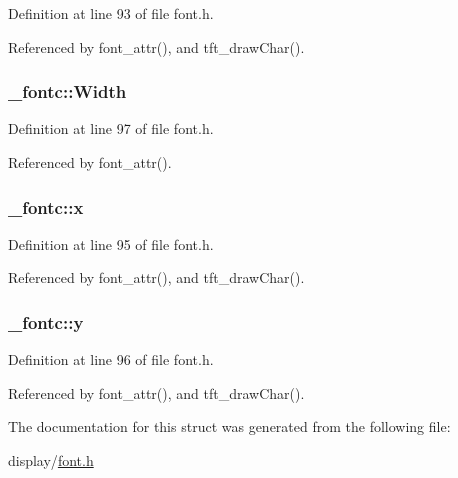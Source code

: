 Definition at line 93 of file font.\+h.



Referenced by font\+\_\+attr(), and tft\+\_\+draw\+Char().

\subsubsection[{\texorpdfstring{Width}{Width}}]{ \+\_\+fontc\+::\+Width}\hypertarget{struct__fontc_ae3c802e1c35ae9a4e37c8eb2e9644325}{}\label{struct__fontc_ae3c802e1c35ae9a4e37c8eb2e9644325}


Definition at line 97 of file font.\+h.



Referenced by font\+\_\+attr().

\subsubsection[{\texorpdfstring{x}{x}}]{ \+\_\+fontc\+::x}\hypertarget{struct__fontc_ad15d00ed46ebe52a085cf05b5ca5da90}{}\label{struct__fontc_ad15d00ed46ebe52a085cf05b5ca5da90}


Definition at line 95 of file font.\+h.



Referenced by font\+\_\+attr(), and tft\+\_\+draw\+Char().

\subsubsection[{\texorpdfstring{y}{y}}]{ \+\_\+fontc\+::y}\hypertarget{struct__fontc_aebbde0dc41068722ee1a69f4a56478a4}{}\label{struct__fontc_aebbde0dc41068722ee1a69f4a56478a4}


Definition at line 96 of file font.\+h.



Referenced by font\+\_\+attr(), and tft\+\_\+draw\+Char().



The documentation for this struct was generated from the following file\+:\begin{DoxyCompactItemize}
\item 
display/\hyperlink{display_2font_8h}{font.\+h}\end{DoxyCompactItemize}
